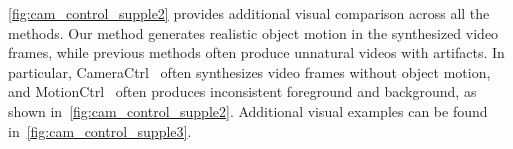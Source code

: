 \cref{fig:cam_control_supple2} provides additional visual comparison across all the methods.
Our method generates realistic object motion in the synthesized video frames, while previous methods often produce unnatural videos with artifacts.
In particular, CameraCtrl~\cite{he2024cameractrl} often synthesizes video frames without object motion, and MotionCtrl~\cite{wang2024motionctrl} often produces inconsistent foreground and background, as shown in~\cref{fig:cam_control_supple2}.
Additional visual examples can be found in~\cref{fig:cam_control_supple3}.








